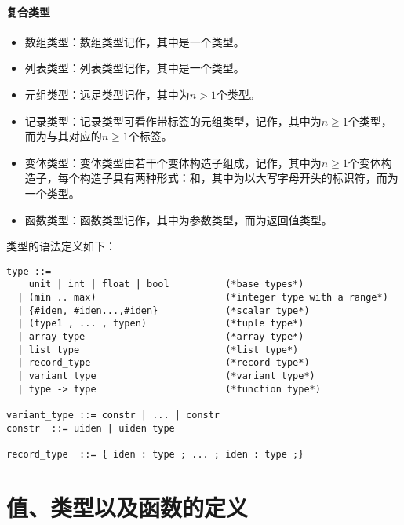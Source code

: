 \paragraph{复合类型}
\begin{itemize}
	\item 数组类型：数组类型记作，其中是一个类型。
	\item 列表类型：列表类型记作，其中是一个类型。
	\item 元组类型：远足类型记作，其中为$n>1$个类型。
	\item 记录类型：记录类型可看作带标签的元组类型，记作，其中为$n\ge 1$个类型，而为与其对应的$n\ge 1$个标签。
	\item 变体类型：变体类型由若干个变体构造子组成，记作，其中为$n\ge 1$个变体构造子，每个构造子具有两种形式：和，其中为以大写字母开头的标识符，而为一个类型。
	\item 函数类型：函数类型记作，其中为参数类型，而为返回值类型。
\end{itemize}
类型的语法定义如下：
\begin{verbatim}
type ::= 
    unit | int | float | bool          (*base types*)
  | (min .. max)                       (*integer type with a range*)
  | {#iden, #iden...,#iden}            (*scalar type*)
  | (type1 , ... , typen)              (*tuple type*)
  | array type                         (*array type*)
  | list type                          (*list type*)
  | record_type                        (*record type*)
  | variant_type                       (*variant type*)
  | type -> type                       (*function type*)

variant_type ::= constr | ... | constr
constr  ::= uiden | uiden type

record_type  ::= { iden : type ; ... ; iden : type ;}
\end{verbatim}
\section{值、类型以及函数的定义}

\cleardoublepage
